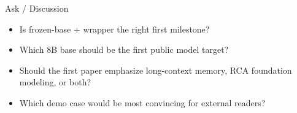 \begin{frame}{Ask / Discussion}
  \begin{itemize}
    \item Is frozen-base + wrapper the right first milestone?
    \item Which 8B base should be the first public model target?
    \item Should the first paper emphasize long-context memory, RCA foundation modeling, or both?
    \item Which demo case would be most convincing for external readers?
  \end{itemize}
\end{frame}
